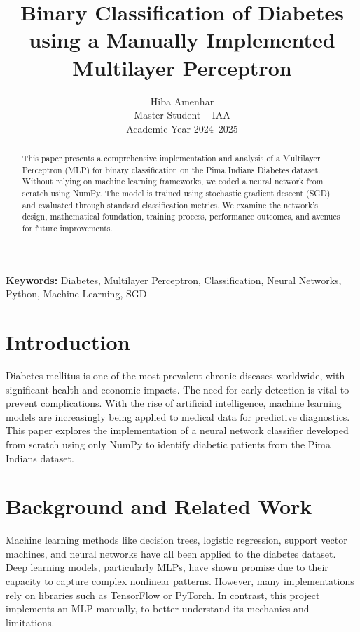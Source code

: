 \documentclass[12pt]{article}
\title{Binary Classification of Diabetes using a Manually Implemented Multilayer Perceptron}
\author{Hiba Amenhar \\ Master Student – IAA \\ Academic Year 2024–2025}
\date{}
\begin{document}
\maketitle

\begin{abstract}
This paper presents a comprehensive implementation and analysis of a Multilayer Perceptron (MLP) for binary classification on the Pima Indians Diabetes dataset. Without relying on machine learning frameworks, we coded a neural network from scratch using NumPy. The model is trained using stochastic gradient descent (SGD) and evaluated through standard classification metrics. We examine the network’s design, mathematical foundation, training process, performance outcomes, and avenues for future improvements.
\end{abstract}

\textbf{Keywords:} Diabetes, Multilayer Perceptron, Classification, Neural Networks, Python, Machine Learning, SGD

\tableofcontents
\newpage

\section{Introduction}
Diabetes mellitus is one of the most prevalent chronic diseases worldwide, with significant health and economic impacts. The need for early detection is vital to prevent complications. With the rise of artificial intelligence, machine learning models are increasingly being applied to medical data for predictive diagnostics. This paper explores the implementation of a neural network classifier developed from scratch using only NumPy to identify diabetic patients from the Pima Indians dataset.

\section{Background and Related Work}
Machine learning methods like decision trees, logistic regression, support vector machines, and neural networks have all been applied to the diabetes dataset. Deep learning models, particularly MLPs, have shown promise due to their capacity to capture complex nonlinear patterns. However, many implementations rely on libraries such as TensorFlow or PyTorch. In contrast, this project implements an MLP manually, to better understand its mechanics and limitations.
\end{document}
